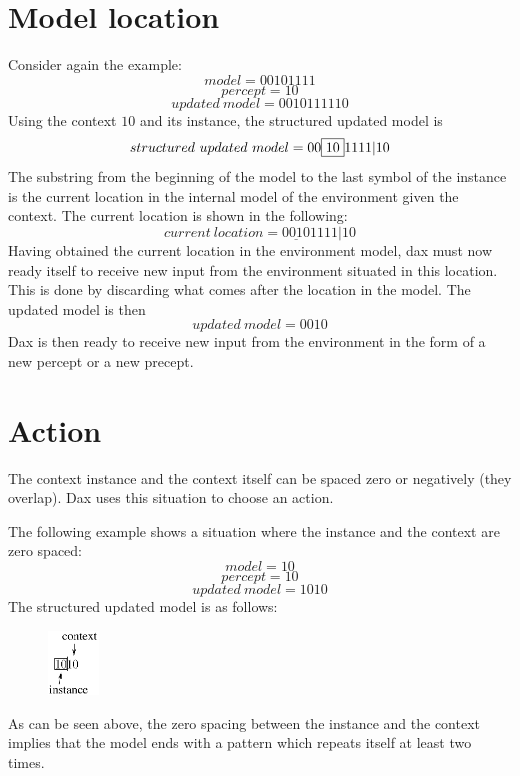 \section{Model location}
Consider again the example:
$$
model = 00101111
$$
$$
percept = 10
$$
$$
updated\ model = 0010111110
$$
\hfill\break
Using the context $10$ and its instance, the structured updated model is
$$
structured\ updated\ model = 00\framebox{$10$}1111 | 10
$$
The substring from the beginning of the model to the last symbol of the
instance is the current location in the internal model of the environment
given the context. The current location is shown in the following:
$$
current\ location = \underline{0010}1111 | 10
$$
\hfill\break
Having obtained the current location in the environment model, dax
must now ready itself to receive new input from the environment
situated in this location. This is done by discarding what
comes after the location in the model. The updated model is then
$$
updated\ model = 0010
$$
Dax is then ready to receive new input from the environment in the form of
a new percept or a new precept.
\hfill\break

\section{Action}
The context instance and the context itself can be spaced zero or
negatively (they overlap). Dax uses this situation to choose an action.

The following example shows a situation where the instance and the context are
zero spaced:
$$
model = 10
$$
$$
percept = 10
$$
$$
updated\ model = 1010
$$
\hfill\break
The structured updated model is as follows:
\hfill\break
\begin{figure}[ht]
  \begin{center}
  \includegraphics[width=0.12\textwidth, keepaspectratio]
                                        {Eps/zeroSpaced1.eps}
  \end{center}
  \label{fig:zeroSpaced1}
\end{figure}
\hfill\break
As can be seen above, the zero spacing between
the instance and the context implies that the model ends with a pattern
which repeats itself at least two times.


